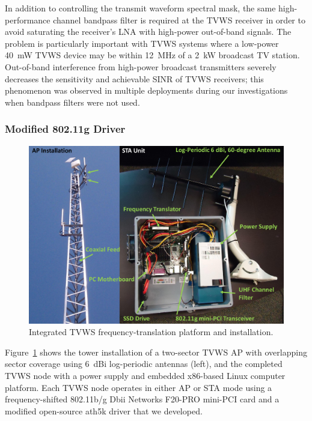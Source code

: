 	In addition to controlling the transmit waveform spectral mask, the same high-performance channel bandpass filter is required at the \ac{TVWS} receiver in order to avoid saturating the receiver's \ac{LNA} with high-power out-of-band signals.
		The problem is particularly important with \ac{TVWS} systems where a low-power 40~mW \ac{TVWS} device may be within 12~MHz of a 2~kW broadcast TV station. 
	Out-of-band interference from high-power broadcast transmitters severely decreases the sensitivity and achievable \ac{SINR} of \ac{TVWS} receivers; this phenomenon was observed in multiple deployments during our investigations when bandpass filters were not used.

\subsubsection{Modified 802.11g Driver}

\begin{figure}[t!]
\centering
  	\includegraphics[width=1\linewidth]{figs/wardrive/TFA_translator_platform}   
   	\caption{Integrated TVWS frequency-translation platform and installation.
	\label{fig_freq_translator_system}}
\end{figure}

	Figure~\ref{fig_freq_translator_system} shows the tower installation of a two-sector \ac{TVWS} \ac{AP} with overlapping sector coverage using 6~dBi log-periodic antennas (left), and the completed \ac{TVWS} node with a power supply and embedded x86-based Linux computer platform.
	Each \ac{TVWS} node operates in either \ac{AP} or \ac{STA} mode using a frequency-shifted 802.11b/g Dbii Networks F20-PRO mini-PCI card and a modified open-source ath5k driver that we developed.
	
